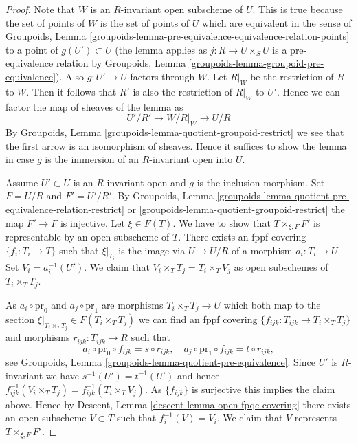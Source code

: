 \begin{proof}
Note that $W$ is an $R$-invariant open subscheme of $U$.
This is true because the set of points of $W$ is the set
of points of $U$ which are equivalent in the sense of
Groupoids,
Lemma \ref{groupoids-lemma-pre-equivalence-equivalence-relation-points}
to a point of $g(U') \subset U$ (the lemma applies as $j : R \to U \times_S U$
is a pre-equivalence relation by
Groupoids, Lemma \ref{groupoids-lemma-groupoid-pre-equivalence}).
Also $g : U' \to U$ factors through $W$.
Let $R|_W$ be the restriction of $R$ to $W$.
Then it follows that $R'$ is also the restriction of $R|_W$ to $U'$.
Hence we can factor the map of sheaves of the lemma as
$$
U'/R' \longrightarrow W/R|_W \longrightarrow U/R
$$
By Groupoids, Lemma \ref{groupoids-lemma-quotient-groupoid-restrict}
we see that the first arrow is an isomorphism of sheaves.
Hence it suffices to show the lemma in case $g$ is the immersion
of an $R$-invariant open into $U$.

\medskip\noindent
Assume $U' \subset U$ is an $R$-invariant open and $g$ is the inclusion
morphism. Set $F = U/R$ and $F' = U'/R'$. By
Groupoids,
Lemma \ref{groupoids-lemma-quotient-pre-equivalence-relation-restrict}
or \ref{groupoids-lemma-quotient-groupoid-restrict}
the map $F' \to F$ is injective. Let $\xi \in F(T)$.
We have to show that $T \times_{\xi, F} F'$ is representable
by an open subscheme of $T$.
There exists an fppf covering $\{f_i : T_i \to T\}$ such that
$\xi|_{T_i}$ is the image via $U \to U/R$ of a morphism $a_i : T_i \to U$.
Set $V_i = a_i^{-1}(U')$.
We claim that $V_i \times_T T_j = T_i \times_T V_j$ as open subschemes
of $T_i \times_T T_j$.

\medskip\noindent
As $a_i \circ \text{pr}_0$ and $a_j \circ \text{pr}_1$ are morphisms
$T_i \times_T T_j \to U$ which both map to the section
$\xi|_{T_i \times_T T_j} \in F(T_i \times_T T_j)$ we can find
an fppf covering $\{f_{ijk} : T_{ijk} \to T_i \times_T T_j\}$ and morphisms
$r_{ijk} : T_{ijk} \to R$ such that
$$
a_i \circ \text{pr}_0 \circ f_{ijk} = s \circ r_{ijk},
\quad
a_j \circ \text{pr}_1 \circ f_{ijk} = t \circ r_{ijk},
$$
see
Groupoids, Lemma \ref{groupoids-lemma-quotient-pre-equivalence}.
Since $U'$ is $R$-invariant we have $s^{-1}(U') = t^{-1}(U')$ and
hence $f_{ijk}^{-1}(V_i \times_T T_j) = f_{ijk}^{-1}(T_i \times_T V_j)$.
As $\{f_{ijk}\}$ is surjective this implies the claim above.
Hence by
Descent, Lemma \ref{descent-lemma-open-fpqc-covering}
there exists an open subscheme $V \subset T$ such that
$f_i^{-1}(V) = V_i$. We claim that $V$ represents $T \times_{\xi, F} F'$.


\end{proof}

